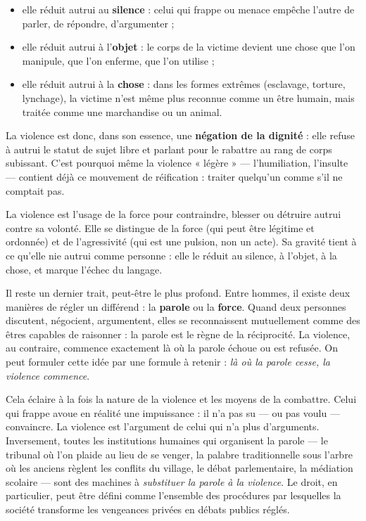 \documentclass[11pt]{article}
\newcounter{popsec}
\newcounter{popsub}
\newcommand{\courssub}[1]{%
  \stepcounter{popsub}%
  \par\vspace{9pt}\noindent{\popxbold\fontsize{11.5}{13}\selectfont\color{popink}{\color{poporange}\thepopsec.\thepopsub}\hspace{6pt}#1}\par\nopagebreak\vspace{4pt}
}
\begin{document}
\begin{itemize}
\item elle réduit autrui au \textbf{silence} : celui qui frappe ou menace empêche l'autre de parler, de répondre, d'argumenter ;
\item elle réduit autrui à l'\textbf{objet} : le corps de la victime devient une chose que l'on manipule, que l'on enferme, que l'on utilise ;
\item elle réduit autrui à la \textbf{chose} : dans les formes extrêmes (esclavage, torture, lynchage), la victime n'est même plus reconnue comme un être humain, mais traitée comme une marchandise ou un animal.
\end{itemize}

La violence est donc, dans son essence, une \textbf{négation de la dignité} : elle refuse à autrui le statut de sujet libre et parlant pour le rabattre au rang de corps subissant. C'est pourquoi même la violence « légère » — l'humiliation, l'insulte — contient déjà ce mouvement de réification : traiter quelqu'un comme s'il ne comptait pas.

\begin{aretenir}
La violence est l'usage de la force pour contraindre, blesser ou détruire autrui contre sa volonté. Elle se distingue de la force (qui peut être légitime et ordonnée) et de l'agressivité (qui est une pulsion, non un acte). Sa gravité tient à ce qu'elle nie autrui comme personne : elle le réduit au silence, à l'objet, à la chose, et marque l'échec du langage.
\end{aretenir}

\courssub{La violence comme échec du langage}

Il reste un dernier trait, peut-être le plus profond. Entre hommes, il existe deux manières de régler un différend : la \textbf{parole} ou la \textbf{force}. Quand deux personnes discutent, négocient, argumentent, elles se reconnaissent mutuellement comme des êtres capables de raisonner : la parole est le règne de la réciprocité. La violence, au contraire, commence exactement là où la parole échoue ou est refusée. On peut formuler cette idée par une formule à retenir : \emph{là où la parole cesse, la violence commence}.

Cela éclaire à la fois la nature de la violence et les moyens de la combattre. Celui qui frappe avoue en réalité une impuissance : il n'a pas su — ou pas voulu — convaincre. La violence est l'argument de celui qui n'a plus d'arguments. Inversement, toutes les institutions humaines qui organisent la parole — le tribunal où l'on plaide au lieu de se venger, la palabre traditionnelle sous l'arbre où les anciens règlent les conflits du village, le débat parlementaire, la médiation scolaire — sont des machines à \emph{substituer la parole à la violence}. Le droit, en particulier, peut être défini comme l'ensemble des procédures par lesquelles la société transforme les vengeances privées en débats publics réglés.
\end{document}
